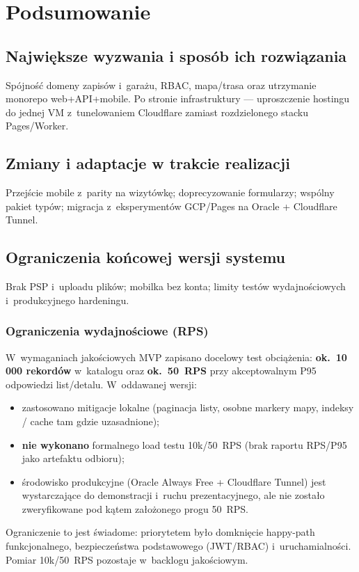 \documentclass{sprz}
\begin{document}
\chapter{Podsumowanie}  
\label{ch:podsumowanie}  
\section{Największe wyzwania i sposób ich rozwiązania}  
Spójność domeny zapisów i~garażu, RBAC, mapa/trasa oraz utrzymanie monorepo web+API+mobile. Po stronie infrastruktury --- uproszczenie hostingu do jednej VM z~tunelowaniem Cloudflare zamiast rozdzielonego stacku Pages/Worker.  
  
\section{Zmiany i adaptacje w trakcie realizacji}  
Przejście mobile z~parity na wizytówkę; doprecyzowanie formularzy; wspólny pakiet typów; migracja z~eksperymentów GCP/Pages na Oracle + Cloudflare Tunnel.  
  
\section{Ograniczenia końcowej wersji systemu}  
Brak PSP i~uploadu plików; mobilka bez konta; limity testów wydajnościowych i~produkcyjnego hardeningu.  
  
\subsection{Ograniczenia wydajnościowe (RPS)}  
W~wymaganiach jakościowych MVP zapisano docelowy test obciążenia: \textbf{ok.\ 10\,000 rekordów} w~katalogu oraz \textbf{ok.\ 50~RPS} przy akceptowalnym P95 odpowiedzi list/detalu. W~oddawanej wersji:  
\begin{itemize}  
 \item zastosowano mitigacje lokalne (paginacja listy, osobne markery mapy, indeksy / cache tam gdzie uzasadnione);  
 \item \textbf{nie wykonano} formalnego load testu 10k/50~RPS (brak raportu RPS/P95 jako artefaktu odbioru);  
 \item środowisko produkcyjne (Oracle Always Free + Cloudflare Tunnel) jest wystarczające do demonstracji i~ruchu prezentacyjnego, ale nie zostało zweryfikowane pod kątem założonego progu 50~RPS.  
\end{itemize}  
Ograniczenie to jest świadome: priorytetem było domknięcie happy-path funkcjonalnego, bezpieczeństwa podstawowego (JWT/RBAC) i~uruchamialności. Pomiar 10k/50~RPS pozostaje w~backlogu jakościowym.  
  
\end{document}
